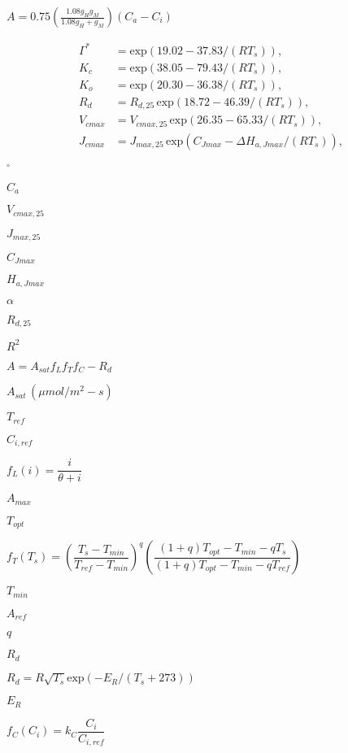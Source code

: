 \documentclass{article}
\begin{document}
$A=0.75\left(\frac{1.08g_Hg_M}{1.08g_H+g_M}\right)\left(C_{a}-C_i\right)$
\pagebreak

\begin{align*}
 \Gamma^* &= \mathrm{exp}\left(19.02-37.83/(RT_s)\right),\\
 K_{c} &= \mathrm{exp}\left(38.05-79.43/(RT_s)\right),\\
 K_{o} &= \mathrm{exp}\left(20.30-36.38/(RT_s)\right),\\
 R_{d} &= R_{d,25}\,\mathrm{exp}\left(18.72-46.39/(RT_s)\right),\\
 V_{cmax} &= V_{cmax,25}\,\mathrm{exp}\left(26.35-65.33/(RT_s)\right),\\
 J_{cmax} &= J_{max,25}\,\mathrm{exp}\left(C_{Jmax}-\Delta H_{a,Jmax}/(RT_s)\right),
 \end{align*}
\pagebreak

$^\circ$
\pagebreak

$C_{a}$
\pagebreak

$V_{cmax,25}$
\pagebreak

$J_{max,25}$
\pagebreak

$C_{Jmax}$
\pagebreak

$H_{a,Jmax}$
\pagebreak

$\alpha$
\pagebreak

$R_{d,25}$
\pagebreak

$R^2$
\pagebreak

$A = A_{sat} f_L f_T f_C - R_d$
\pagebreak

$A_{sat}\,({\mu}mol/m^2-s)$
\pagebreak

$T_{ref}$
\pagebreak

$C_{i,ref}$
\pagebreak

$f_L(i) = \dfrac{i}{\theta+i}$
\pagebreak

$A_{max}$
\pagebreak

$T_{opt}$
\pagebreak

$f_T(T_s) = \left(\dfrac{T_s-T_{min}}{T_{ref}-T_{min}}\right)^q\left(\dfrac{(1+q)T_{opt}-T_{min}-qT_s}{(1+q)T_{opt}-T_{min}-qT_{ref}}\right)$
\pagebreak

$T_{min}$
\pagebreak

$A_{ref}$
\pagebreak

$q$
\pagebreak

$R_d$
\pagebreak

$R_d = R\sqrt{T_s}\mathrm{exp}\left(-E_R/(T_s+273)\right)$
\pagebreak

$E_R$
\pagebreak

$f_C(C_i) = k_C\dfrac{C_i}{C_{i,ref}}$
\pagebreak
\end{document}
